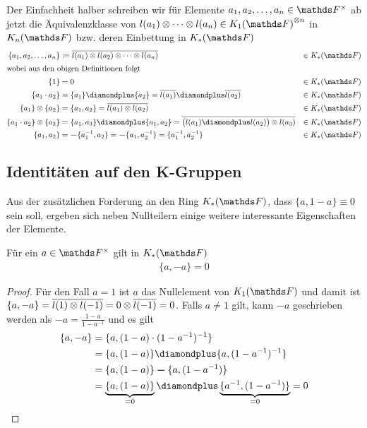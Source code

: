 \documentclass[ngerman,fontsize=11pt, paper=a4, parskip=half, titlepage=true, toc=bib]{scrartcl}
\begin{document}
\begin{Not}
  Der Einfachheit halber schreiben wir 
  für Elemente $a_1,a_2,\dotsc,a_n\in\Fx$ ab jetzt
  die Äquivalenzklasse von 
  $l(a_1)\otimes\dotsb\otimes l(a_n)\in{\KoF}^{\otimes n}$ 
  in $\KnF$ bzw. deren Einbettung in $\KF$
  \begin{align*}
    \{ a_1,a_2,\dotsc,a_n\}
    &\coloneqq \overline{l(a_1)\otimes l(a_2)\otimes \dotsb \otimes
      l(a_n)} 
    &\in\KF\\ 
    \intertext{wobei aus den obigen Definitionen folgt}
    \{1\}&=0 &\in\KF\\
    \{ a_1 \cdot a_2 \}
    &=  \{a_1\}\p \{a_2\} = \overline{l(a_1)} \p \overline{l(a_2)}  &\in\KF \\
    \{ a_1 \} \otimes \{ a_2 \}
    &= \{ a_1,a_2 \} = \overline{l(a_1)\otimes l(a_2)} &\in\KF \\
    \{ a_1\cdot a_2 \} \otimes \{ a_3 \}
    &= \{ a_1,a_3 \} \p \{a_1, a_2\} 
      = \overline{\big(l(a_1)\p l(a_2)\big) \otimes l(a_3)} &\in\KF\\
    \{ a_1, a_2\} 
    &= \m\{a_1^{-1},a_2\} = \m\{a_1,a_2^{-1}\} 
      = \{a_1^{-1},a_2^{-1}\} &\in\KF                               
  \end{align*}
\end{Not}

\subsection{Identitäten auf den K-Gruppen}
Aus der zusätzlichen Forderung an den Ring $\KF$, 
dass $\{a,1-a\}\equiv 0$ sein soll, ergeben sich neben Nullteilern 
einige weitere interessante Eigenschaften der Elemente.

\begin{Lem}\label{identitaetminus}
  Für ein $a \in\Fx$ gilt in $\KF$
  \begin{gather*}
    \{a,-a\}=0
  \end{gather*}
  \begin{proof}
    Für den Fall $a=1$ ist $a$ das Nullelement von $\KoF$ und damit ist 
    $\{a,-a\}=\overline{l(1)\otimes l(-1)} = 0\otimes \overline{l(-1)} = 0$.
    Falls $a\neq 1$ gilt, kann $-a$ geschrieben werden als
    $-a=\frac{1-a}{1-a^{-1}}$ und es gilt
    \begin{align*}
      \{a,-a\} &= \{a,(1-a)\cdot (1-a^{-1})^{-1}\}\\
               &= \{a,(1-a)\}\p\{a,(1-a^{-1})^{-1}\} \\
               &= \{a,(1-a)\}\m\{a,(1-a^{-1})\} \\
               &= \underbrace{\{a,(1-a)\}}_{=0}
                 \p\underbrace{\{a^{-1},(1-a^{-1})\}}_{=0} 
                 =0
    \end{align*}
  \end{proof}
\end{Lem}
\end{document}
